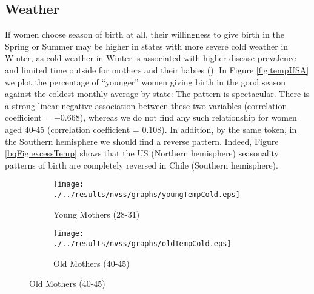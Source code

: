 \documentclass[a4paper, 12 pt]{article}
\theoremstyle{plain}
\begin{document}
\begin{doublespace}
\subsection{Weather}
If women choose season of birth at all, their willingness to give birth in the Spring or Summer may be higher in states with more severe cold weather in Winter, as cold weather in Winter is associated with higher disease prevalence and limited time outside for mothers and their babies (\citealp{CS2013}). In Figure \ref{fig:tempUSA} we plot the percentage of ``younger'' women giving birth in the good season against the coldest monthly average by state: The pattern is spectacular. There is a strong linear negative association between these two variables (correlation coefficient = $-0.668$), whereas we do not find any such relationship for women aged 40-45 (correlation coefficient = $0.108$). In addition, by the same token, in the Southern hemisphere we should find a reverse pattern. Indeed, Figure \ref{bqFig:excessTemp} shows that the US (Northern hemisphere) seasonality patterns of birth are completely reversed in Chile (Southern hemisphere).

\begin{figure}[htpb!]
\begin{center}
\caption{Prevalence of Good Season and Cold Temperatures by State and Age}
\label{fig:tempUSA}
\begin{subfigure}{.5\textwidth}
  \centering
  \texttt{[image: ./../results/nvss/graphs/youngTempCold.eps]}
  \caption{Young Mothers (28-31)}
  \label{fig:tempUSAYoung}
\end{subfigure}%
\begin{subfigure}{.5\textwidth}
  \centering
  \texttt{[image: ./../results/nvss/graphs/oldTempCold.eps]}
  \caption{Old Mothers (40-45)}
  \label{fig:tempUSAOld}
\end{subfigure}
\end{center}
\end{figure}




\end{doublespace}
\end{document}
